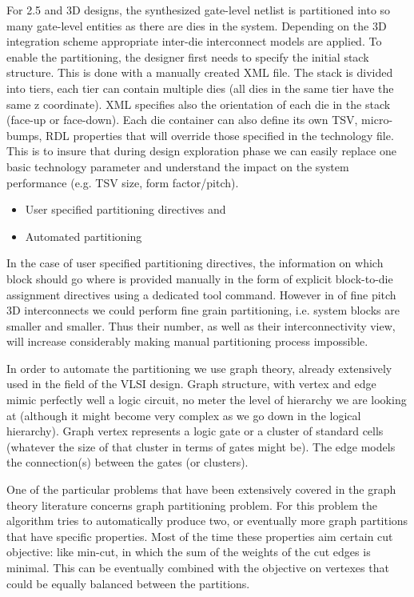 For 2.5 and 3D designs, the synthesized gate-level netlist is partitioned into so many gate-level entities as there are dies in the system. Depending on the 3D integration scheme appropriate inter-die interconnect models are applied. To enable the partitioning, the designer first needs to specify the initial stack structure. This is done with a manually created XML file. The stack is divided into tiers, each tier can contain multiple dies (all dies in the same tier have the same z coordinate). XML specifies also the orientation of each die in the stack (face-up or face-down). Each die container can also define its own TSV, micro-bumps, RDL properties that will override those specified in the technology file. This is to insure that during design exploration phase we can easily replace one basic technology parameter and understand the impact on the system performance (e.g. TSV size, form factor/pitch).

\begin{itemize}
\item User specified partitioning directives and
\item Automated partitioning
\end{itemize}

In the case of user specified partitioning directives, the information on which block should go where is provided manually in the form of explicit block-to-die assignment directives using a dedicated tool command. However in of fine pitch 3D interconnects we could perform fine grain partitioning, i.e. system blocks are smaller and smaller. Thus their number, as well as their interconnectivity view, will increase considerably making manual partitioning process impossible.

In order to automate the partitioning we use graph theory, already extensively used in the field of the VLSI design. Graph structure, with vertex and edge mimic perfectly well a logic circuit, no meter the level of hierarchy we are looking at (although it might become very complex as we go down in the logical hierarchy). Graph vertex represents a logic gate or a cluster of standard cells (whatever the size of that cluster in terms of gates might be). The edge models the connection(s) between the gates (or clusters).

One of the particular problems that have been extensively covered in the graph theory literature concerns graph partitioning problem. For this problem the algorithm tries to automatically produce two, or eventually more graph partitions that have specific properties. Most of the time these properties aim certain cut objective: like min-cut, in which the sum of the weights of the cut edges is minimal. This can be eventually combined with the objective on vertexes that could be equally balanced between the partitions.

